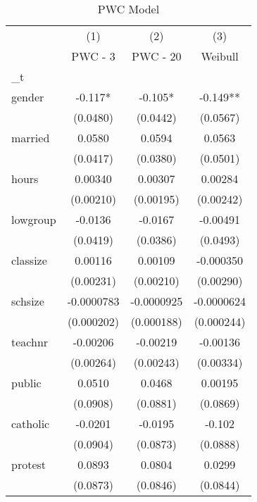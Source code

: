 \begin{table}[htbp]\centering
\def\sym#1{\ifmmode^{#1}\else\(^{#1}\)\fi}
\caption{PWC Model}
\begin{tabular}{l*{3}{c}}
\hline\hline
            &\multicolumn{1}{c}{(1)}&\multicolumn{1}{c}{(2)}&\multicolumn{1}{c}{(3)}\\
            &\multicolumn{1}{c}{PWC - 3}&\multicolumn{1}{c}{PWC - 20}&\multicolumn{1}{c}{Weibull}\\
\hline
\_t          &              &              &              \\
gender      &      -0.117* &      -0.105* &      -0.149**\\
            &    (0.0480)  &    (0.0442)  &    (0.0567)  \\
[1em]
married     &      0.0580  &      0.0594  &      0.0563  \\
            &    (0.0417)  &    (0.0380)  &    (0.0501)  \\
[1em]
hours       &     0.00340  &     0.00307  &     0.00284  \\
            &   (0.00210)  &   (0.00195)  &   (0.00242)  \\
[1em]
lowgroup    &     -0.0136  &     -0.0167  &    -0.00491  \\
            &    (0.0419)  &    (0.0386)  &    (0.0493)  \\
[1em]
classize    &     0.00116  &     0.00109  &   -0.000350  \\
            &   (0.00231)  &   (0.00210)  &   (0.00290)  \\
[1em]
schsize     &  -0.0000783  &  -0.0000925  &  -0.0000624  \\
            &  (0.000202)  &  (0.000188)  &  (0.000244)  \\
[1em]
teachnr     &    -0.00206  &    -0.00219  &    -0.00136  \\
            &   (0.00264)  &   (0.00243)  &   (0.00334)  \\
[1em]
public      &      0.0510  &      0.0468  &     0.00195  \\
            &    (0.0908)  &    (0.0881)  &    (0.0869)  \\
[1em]
catholic    &     -0.0201  &     -0.0195  &      -0.102  \\
            &    (0.0904)  &    (0.0873)  &    (0.0888)  \\
[1em]
protest     &      0.0893  &      0.0804  &      0.0299  \\
            &    (0.0873)  &    (0.0846)  &    (0.0844)  \\

\end{tabular}
\end{table}
